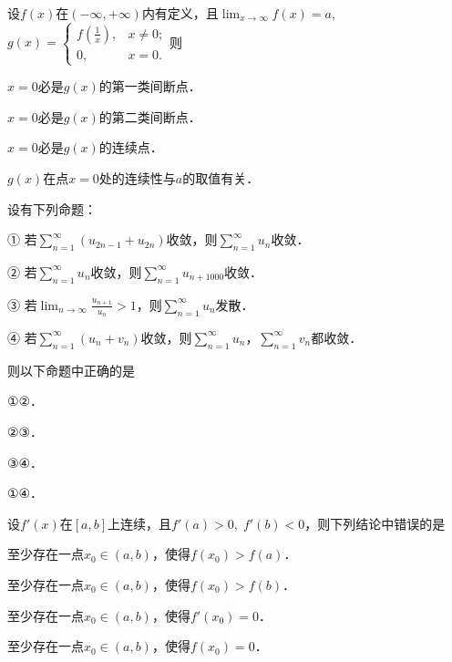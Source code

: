 \documentclass[plain,noanswer,medmath]{../../template/jnuexam}
\begin{document}
\begin{problem}
设$f(x)$在$(-\infty , +\infty)$内有定义，且$\lim_{x \to \infty} f(x) = a$,$g(x) = \begin{cases}
  f\left(\frac{1}{x} \right), & x \ne 0; \\
                           0, & x = 0.
\end{cases}$则\pickout{}
\begin{abcd}
\item $x = 0$必是$g(x)$的第一类间断点．
\item $x = 0$必是$g(x)$的第二类间断点．
\item $x = 0$必是$g(x)$的连续点．
\item $g(x)$在点$x = 0$处的连续性与$a$的取值有关．
\end{abcd}
\end{problem}




\begin{problem}
设有下列命题：\par
① 若$\sum_{n = 1}^{\infty}(u_{2n - 1} + u_{2n})$收敛，则$\sum_{n = 1}^{\infty}u_n$收敛．\par
② 若$\sum_{n = 1}^{\infty}u_n$收敛，则$\sum_{n = 1}^{\infty}u_{n + 1000}$收敛．\par
③ 若$\lim_{n \to \infty} \frac{u_{n + 1}}{u_n} > 1$，则$\sum_{n = 1}^{\infty}u_n$发散．\par
④ 若$\sum_{n = 1}^{\infty}(u_n + v_n)$收敛，则$\sum_{n = 1}^{\infty}u_n$，$\sum_{n = 1}^{\infty}v_n$都收敛．\par
则以下命题中正确的是\pickout{}
\begin{abcd}
\item ①②．
\item ②③．
\item ③④．
\item ①④．
\end{abcd}
\end{problem}


\begin{problem}
设$f'(x)$在$[a,b]$上连续，且$f'(a) > 0,\;f'(b) < 0$，则下列结论中错误的是\pickout{}
\begin{abcd}
\item 至少存在一点$x_0 \in(a,b)$，使得$f(x_0) > f(a)$．
\item 至少存在一点$x_0 \in(a,b)$，使得$f(x_0) > f(b)$．
\item 至少存在一点$x_0 \in(a,b)$，使得$f'(x_0) = 0$．
\item 至少存在一点$x_0 \in(a,b)$，使得$f(x_0) = 0$．
\end{abcd}
\end{problem}
\end{document}
